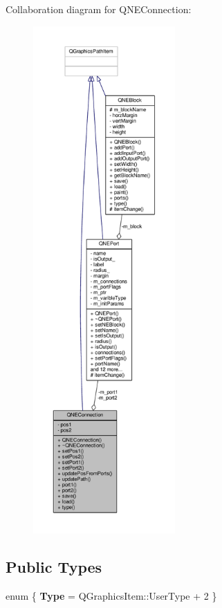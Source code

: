 Collaboration diagram for Q\-N\-E\-Connection\-:
\nopagebreak
\begin{figure}[H]
\begin{center}
\leavevmode
\includegraphics[height=550pt]{class_q_n_e_connection__coll__graph}
\end{center}
\end{figure}
\subsection*{Public Types}
\begin{DoxyCompactItemize}
\item 
enum \{ {\bfseries Type} = Q\-Graphics\-Item\-:\-:User\-Type + 2
 \}
\end{DoxyCompactItemize}
